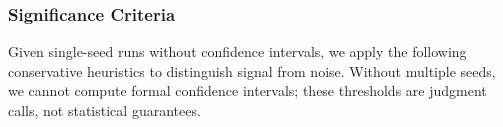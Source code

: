 \subsubsection{Significance Criteria}
\nestindent

Given single-seed runs without confidence intervals, we apply the following conservative heuristics to distinguish signal from noise.
Without multiple seeds, we cannot compute formal confidence intervals; these thresholds are judgment calls, not statistical guarantees.


\nestunindent
